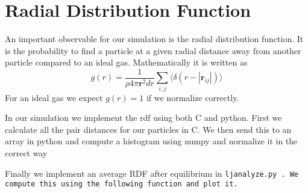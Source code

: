 \section{Radial Distribution Function}
An important observable for our simulation is the radial distribution function. It is the probability to find a particle at a given radial distance away from another particle compared to an ideal gas. Mathematically it is written as
\begin{equation}
g(r) = \frac{1}{\rho 4 \pi \mathbf{r}^2 dr}\sum_{i,j} \langle \delta (r - |\mathbf{r}_{ij}|)\rangle
\end{equation}
For an ideal gas we expect $g(r) = 1$ if we normalize correctly. 

In our simulation we implement the rdf using both C and python. First we calculate all the pair distances for our particles in C.
We then send this to an array in python and compute a histogram using numpy and normalize it in the correct way

Finally we implement an average RDF after equilibrium in \tt{ljanalyze.py }. We compute this using the following function
and plot it.